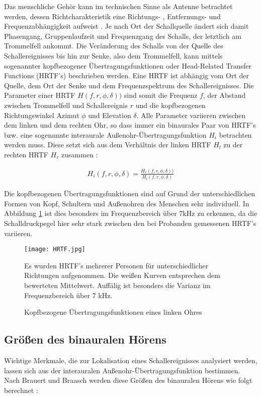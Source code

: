 Das menschliche Gehör kann im technischen Sinne als Antenne betrachtet werden, dessen Richtcharakteristik eine Richtungs- , Entfernungs-  und Frequenzabhängigkeit aufweist \cite[S.89]{HdA08}. Je nach Ort der Schallquelle ändert sich damit Phasengang, Gruppenlaufzeit und Frequenzgang des Schalls, der letztlich am Trommelfell ankommt. Die Veränderung des Schalls von der Quelle des Schallereignisses bis hin zur Senke, also dem Trommelfell, kann mittels sogenannter kopfbezogener Übertragungsfunktionen oder Head-Related Transfer Functions (HRTF's) beschrieben werden. Eine HRTF ist abhängig vom Ort der Quelle, dem Ort der Senke und dem Frequenzspektrum des Schallereignisses. Die Parameter einer HRTF $H(f,r,\phi,\delta))$ sind somit die Frequenz $f$, der Abstand zwischen Trommelfell und Schallereignis $r$ und die kopfbezogenen Richtungswinkel Azimut $\phi$ und Elevation $\delta$. Alle Parameter variieren zwischen dem linken und dem rechten Ohr, so dass immer ein binaurales Paar von HRTF's bzw. eine sogenannte interaurale Außenohr-Übertragungsfunktion $H_i$ betrachten werden muss. Diese setzt sich aus dem Verhältnis der linken HRTF $H_l$ zu der rechten HRTF $H_r$ zusammen \cite[S.91]{HdA08}:

\begin{align}
H_i(f,r,\phi,\delta) = \frac{H_r(f,r,\phi,\delta))}{H_l(f,r,\phi,\delta)}
\end{align}

 Die kopfbezogenen Übertragungsfunktionen sind auf Grund der unterschiedlichen Formen von Kopf, Schultern und Außenohren des Menschen sehr individuell. In Abbildung \ref{fig:HRTF} ist dies besonders im Frequenzbereich über 7kHz zu erkennen, da die Schalldruckpegel hier sehr stark zwischen den bei Probanden gemessenen HRTF's variieren. 

\begin{figure}[H]
\centering
\texttt{[image: HRTF.jpg]}
\caption{Kopfbezogene Übertragungsfunktionen eines linken Ohres}
Es wurden HRTF's mehrerer Personen für unterschiedlicher Richtungen aufgenommen. Die weißen Kurven entsprechen dem bewerteten Mittelwert. Auffälig ist besonders die Varianz im Frequenzbereich über 7 kHz.

\label{fig:HRTF}
\end{figure}

\subsection{Größen des binauralen Hörens}
Wichtige Merkmale, die zur Lokalisation eines Schallereignisses analysiert werden, lassen sich aus der interauralen Außenohr-Übertragungsfunktion bestimmen. Nach Brauert und Braasch werden diese Größen des binauralen Hörens wie folgt berechnet \cite[S.91]{HdA08}:

